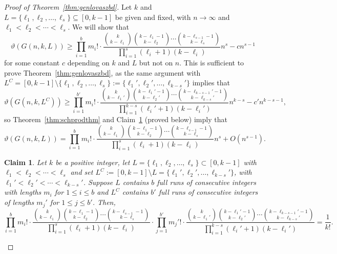\documentclass[11pt]{article}
\newtheorem{claim}[theorem]{Claim}
\theoremstyle{definition}
\theoremstyle{remark}
\begin{document}
\begin{proof}[Proof of Theorem~\ref{thm:genlovaszbd}]
Let $k$ and $L = \{\ell_1, \ell_2, \ldots, \ell_s\}\subseteq[0, k-1]$ be given and fixed, with $n\rightarrow \infty$ and $\ell_1 < \ell_2 < \cdots < \ell_s$. We will show that \[\vartheta(G(n, k, L)) \ge \prod_{i=1}^{b}m_i!\cdot\frac{\binom{k}{k-\ell_1}\binom{k-\ell_1-1}{k-\ell_2}\cdots \binom{k-\ell_{s-1}-1}{k-\ell_s}}{\prod_{i=1}^s(\ell_i+1)(k-\ell_i)} n^{s} - cn^{s-1}\] for some constant $c$ depending on $k$ and $L$ but not on $n$. This is sufficient to prove Theorem~\ref{thm:genlovaszbd}, as the same argument with $L^C = [0, k-1]\setminus\{\ell_1, \ell_2, \ldots, \ell_s\} := \{\ell_1', \ell_2', \ldots, \ell_{k-s}'\}$ implies that \[\vartheta(G(n, k, L^C)) \ge \prod_{i=1}^{b'}m_i!\cdot\frac{\binom{k}{k-\ell_1'}\binom{k-\ell_1'-1}{k-\ell_2'}\cdots \binom{k-\ell_{k-s-1}'-1}{k-\ell_{k-s}'}}{\prod_{i=1}^{k-s}(\ell_i'+1)(k-\ell_i')}n^{k-s} - c'n^{k-s-1},\] so Theorem~\ref{thm:schprodthm} and Claim~\ref{clm:multto1/k!} (proved below) imply that \[\vartheta(G(n, k, L)) = \prod_{i=1}^{b}m_i!\cdot\frac{\binom{k}{k-\ell_1}\binom{k-\ell_1-1}{k-\ell_2}\cdots \binom{k-\ell_{s-1}-1}{k-\ell_s}}{\prod_{i=1}^s(\ell_i+1)(k-\ell_i)}n^{s} + O(n^{s-1}).\]

\begin{claim}\label{clm:multto1/k!}
Let $k$ be a positive integer, let $L = \{\ell_1, \ell_2, \ldots, \ell_s\} \subset [0, k-1]$  with  $\ell_1 < \ell_2 < \cdots < \ell_s$ and set $L^C:=[0, k-1]\setminus L = \{\ell_1', \ell_2', \ldots, \ell_{k-s}'\}$, with $\ell_1' < \ell_2' < \cdots < \ell_{k-s}'$. Suppose $L$ contains $b$ full runs of consecutive integers with lengths $m_i$ for $1\le i \le b$ and $L^C$ contains $b'$ full runs of consecutive integers of lengths $m_j'$ for $1\le j\le b'$. Then, 
\[\prod_{i=1}^{b}m_i!\cdot\frac{\binom{k}{k-\ell_1}\binom{k-\ell_1-1}{k-\ell_2}\cdots \binom{k-\ell_{s-1}-1}{k-\ell_s}}{\prod_{i=1}^s(\ell_i+1)(k-\ell_i)} \cdot \prod_{j=1}^{b'}m_j'!\cdot\frac{\binom{k}{k-\ell_1'}\binom{k-\ell_1'-1}{k-\ell_2'}\cdots \binom{k-\ell_{k-s-1}'-1}{k-\ell_{k-s}'}}{\prod_{i=1}^{k-s}(\ell_i'+1)(k-\ell_i')} = \frac{1}{k!}.\]
\end{claim}


\end{proof}
\end{document}
